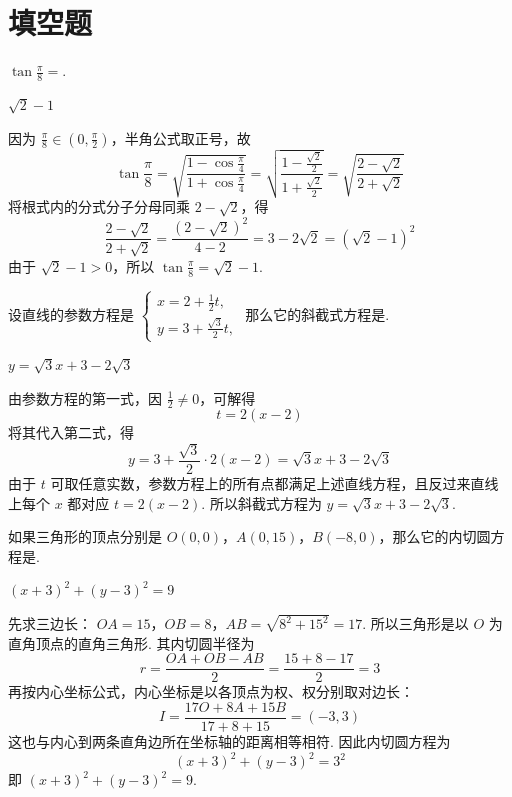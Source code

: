 \section{填空题}

\begin{problem}
\(\tan \frac{\pi}{8}=\)\fillinblank{}.
\end{problem}

\begin{answer}
\(\sqrt{2}-1\)
\end{answer}

\begin{solution}
因为 \(\frac\pi8\in(0,\frac\pi2)\)，半角公式取正号，故
\[
\tan\frac{\pi}{8}=\sqrt{\frac{1-\cos\frac{\pi}{4}}{1+\cos\frac{\pi}{4}}}
=\sqrt{\frac{1-\frac{\sqrt{2}}2}{1+\frac{\sqrt{2}}2}}
 =\sqrt{\frac{2-\sqrt2}{2+\sqrt2}}
\]
将根式内的分式分子分母同乘 \(2-\sqrt2\)，得
\[
\frac{2-\sqrt2}{2+\sqrt2}
=\frac{(2-\sqrt2)^2}{4-2}=3-2\sqrt2=(\sqrt2-1)^2
\]
由于 \(\sqrt2-1>0\)，所以 \(\tan\frac\pi8=\sqrt2-1\).
\end{solution}

\begin{problem}
设直线的参数方程是 \(\begin{cases}
x=2+\frac{1}{2}t,\\
y=3+\frac{\sqrt{3}}{2}t,
\end{cases}\) 那么它的斜截式方程是\fillinblank{}.
\end{problem}

\begin{answer}
\(y=\sqrt{3}x+3-2\sqrt{3}\)
\end{answer}

\begin{solution}
由参数方程的第一式，因 \(\frac12\ne0\)，可解得
\[
t=2(x-2)
\]
将其代入第二式，得
\[
y=3+\frac{\sqrt{3}}2\cdot2(x-2)=\sqrt{3}x+3-2\sqrt{3}
\]
由于 \(t\) 可取任意实数，参数方程上的所有点都满足上述直线方程，且反过来直线上每个 \(x\) 都对应 \(t=2(x-2)\). 所以斜截式方程为 \(y=\sqrt{3}x+3-2\sqrt{3}\).
\end{solution}

\begin{problem}
如果三角形的顶点分别是 \(O(0,0)\)，\(A(0,15)\)，\(B(-8,0)\)，那么它的内切圆方程是\fillinblank{}.
\end{problem}

\begin{answer}
\((x+3)^2+(y-3)^2=9\)
\end{answer}

\begin{solution}
先求三边长：
\(OA=15\)，\(OB=8\)，\(AB=\sqrt{8^2+15^2}=17\).
所以三角形是以 \(O\) 为直角顶点的直角三角形. 其内切圆半径为
\[
r=\frac{OA+OB-AB}{2}=\frac{15+8-17}{2}=3
\]
再按内心坐标公式，内心坐标是以各顶点为权、权分别取对边长：
\[
I=\frac{17O+8A+15B}{17+8+15}=(-3,3)
\]
这也与内心到两条直角边所在坐标轴的距离相等相符. 因此内切圆方程为
\[
(x+3)^2+(y-3)^2=3^2
\]
即 \((x+3)^2+(y-3)^2=9\).
\end{solution}

